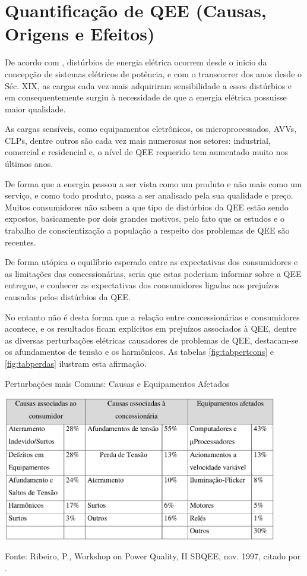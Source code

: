 \section{Quantificação de QEE (Causas, Origens e Efeitos)}\label{qeeCOE}
\par
De acordo com \cite{ALV10}, distúrbios de energia elétrica ocorrem desde o inicio da concepção de sistemas elétricos de potência, e com o transcorrer dos anos desde o Séc. XIX, as cargas cada vez mais adquiriram sensibilidade a esses distúrbios e em consequentemente surgiu à necessidade de que a energia elétrica possuísse maior qualidade.
\par
As cargas sensíveis, como equipamentos eletrônicos, os microprocessados, \ac{AVVs}, \ac{CLPs}, dentre outros são cada vez mais numerosas nos setores: industrial, comercial e residencial e, o nível de QEE requerido tem aumentado muito nos últimos anos. 
\par De forma que a energia passou a ser vista como um produto e não mais como um serviço, e como todo produto, passa a ser analisado pela sua qualidade e preço. Muitos consumidores não sabem a que tipo de distúrbios da QEE estão sendo expostos, basicamente por dois grandes motivos, pelo fato que os estudos e o trabalho de conscientização a população a respeito dos problemas de QEE são recentes. 
\par
De forma utópica o equilíbrio esperado entre as expectativas dos consumidores e as limitações das concessionárias, seria que estas poderiam informar sobre a  \ac{QEE} entregue, e conhecer as expectativas dos consumidores ligadas aos prejuízos causados pelos distúrbios da \ac{QEE}.
\par
No entanto não é desta forma que a relação entre concessionárias e consumidores acontece, e os resultados ficam explícitos em prejuízos associados à \ac{QEE}, dentre as diversas perturbações elétricas causadores de problemas de \ac{QEE}, destacam-se os afundamentos de tensão e os harmônicos. As tabelas \ref{fig:tabpertcons} e \ref{fig:tabperdas} ilustram esta afirmação.
\begin{table}[!h]
\begin{center}
\caption{Perturbações mais Comuns: Causas e Equipamentos Afetados}
\includegraphics[width=12cm]{imagens/tab2-cap2.png}
\par{\small Fonte: Ribeiro, P., Workshop on Power Quality, II SBQEE, nov. 1997, citado por \cite{ALV10}.}
\label{fig:tabpertcons}
\end{center}
\end{table}

